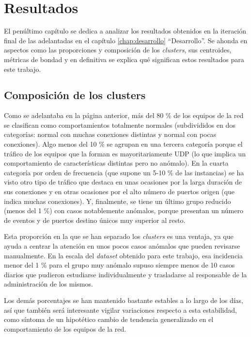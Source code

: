 \chapter{Resultados}\label{chap:resultados}

El penúltimo capítulo se dedica a analizar los resultados obtenidos en la iteración final de las adelantadas en el capítulo \ref{chap:desarrollo} ``Desarrollo''.
Se ahonda en aspectos como las proporciones y composición de los \emph{clusters}, sus centroides, métricas de bondad y en definitiva se explica qué significan estos resultados para este trabajo.

\section{Composición de los clusters}\label{sec:composicionclusters}

Como se adelantaba en la página anterior, más del 80 \% de los equipos de la red se clasifican como comportamientos totalmente normales (subdivididos en dos categorías: normal con muchas conexiones distintas y normal con pocas conexiones).
Algo menos del 10 \% se agrupan en una tercera categoría porque el tráfico de los equipos que la forman es mayoritariamente UDP (lo que implica un comportamiento de características distintas pero no anómalo).
En la cuarta categoría por orden de frecuencia (que supone un 5-10 \% de las instancias) se ha visto otro tipo de tráfico que destaca en unas ocasiones por la larga duración de sus conexiones y en otras ocasiones por el alto número de puertos origen (que indica muchas conexiones).
Y, finalmente, se tiene un último grupo reducido (menos del 1 \%) con casos notablemente anómalos, porque presentan un número de eventos y de puertos destino únicos muy superior al resto.

Esta proporción en la que se han separado los \emph{clusters} es una ventaja, ya que ayuda a centrar la atención en unos pocos casos anómalos que pueden revisarse manualmente.
En la escala del \emph{dataset} obtenido para este trabajo, esa incidencia menor del 1 \% para el grupo muy anómalo supuso siempre menos de 10 casos diarios que pudieron estudiarse individualmente y trasladarse al responsable de la administración de los mismos.

Los demás porcentajes se han mantenido bastante estables a lo largo de los días, así que también será interesante vigilar variaciones respecto a esta estabilidad, como síntoma de un hipotético cambio de tendencia generalizado en el comportamiento de los equipos de la red.

